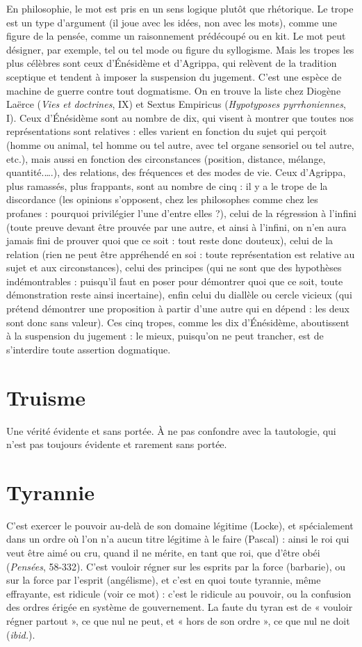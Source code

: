 En philosophie, le mot est pris en un sens logique plutôt que rhétorique. Le
trope est un type d’argument (il joue avec les idées, non avec les mots), comme
une figure de la pensée, comme un raisonnement prédécoupé ou en kit. Le mot
peut désigner, par exemple, tel ou tel mode ou figure du syllogisme. Mais les
tropes les plus célèbres sont ceux d’Énésidème et d’Agrippa, qui relèvent de la
tradition sceptique et tendent à imposer la suspension du jugement. C’est une
espèce de machine de guerre contre tout dogmatisme. On en trouve la liste
chez Diogène Laërce ({\it Vies et doctrines}, IX) et Sextus Empiricus ({\it Hypotyposes
pyrrhoniennes}, I). Ceux d’Énésidème sont au nombre de dix, qui visent à montrer
que toutes nos représentations sont relatives : elles varient en fonction du
sujet qui perçoit (homme ou animal, tel homme ou tel autre, avec tel organe
sensoriel ou tel autre, etc.), mais aussi en fonction des circonstances (position,
distance, mélange, quantité.….), des relations, des fréquences et des modes de
vie. Ceux d’Agrippa, plus ramassés, plus frappants, sont au nombre de cinq : il
y a le trope de la discordance (les opinions s'opposent, chez les philosophes
comme chez les profanes : pourquoi privilégier l’une d’entre elles ?), celui de la
régression à l'infini (toute preuve devant être prouvée par une autre, et ainsi à
l'infini, on n’en aura jamais fini de prouver quoi que ce soit : tout reste donc
douteux), celui de la relation (rien ne peut être appréhendé en soi : toute représentation
est relative au sujet et aux circonstances), celui des principes (qui ne
sont que des hypothèses indémontrables : puisqu'il faut en poser pour démontrer
quoi que ce soit, toute démonstration reste ainsi incertaine), enfin celui du
diallèle ou cercle vicieux (qui prétend démontrer une proposition à partir d’une
autre qui en dépend : les deux sont donc sans valeur). Ces cinq tropes, comme
les dix d’Énésidème, aboutissent à la suspension du jugement : le mieux,
puisqu'on ne peut trancher, est de s’interdire toute assertion dogmatique.

\section{Truisme}
Une vérité évidente et sans portée. À ne pas confondre avec la
tautologie, qui n’est pas toujours évidente et rarement sans portée.

\section{Tyrannie}
C'est exercer le pouvoir au-delà de son domaine légitime
(Locke), et spécialement dans un ordre où l’on n’a aucun titre
légitime à le faire (Pascal) : ainsi le roi qui veut être aimé ou cru, quand il ne
mérite, en tant que roi, que d’être obéi ({\it Pensées}, 58-332). C’est vouloir régner
sur les esprits par la force (barbarie), ou sur la force par l'esprit (angélisme), et
c’est en quoi toute tyrannie, même effrayante, est ridicule (voir ce mot) : c’est
le ridicule au pouvoir, ou la confusion des ordres érigée en système de gouvernement.
La faute du tyran est de « vouloir régner partout », ce que nul ne peut,
et « hors de son ordre », ce que nul ne doit ({\it ibid.}).


